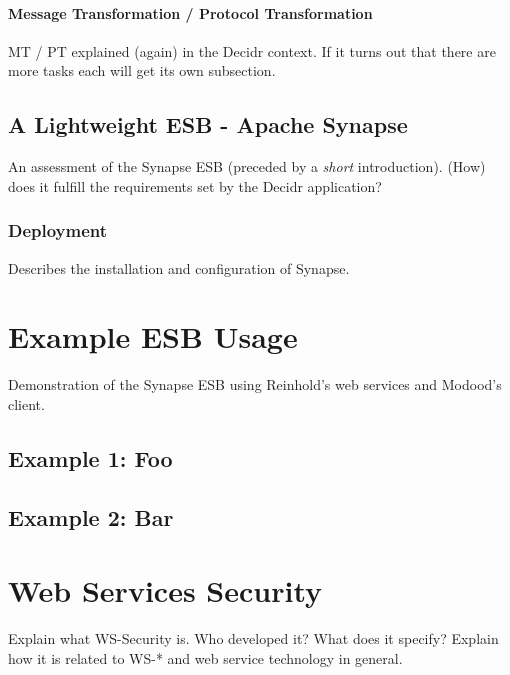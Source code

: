 \subsubsection{Message Transformation / Protocol Transformation}
\label{subsubsec:message-transformation-protocol-transformation}
MT / PT explained (again) in the Decidr context. If it turns out that there are
more tasks each will get its own subsection.

\section{A Lightweight ESB - Apache Synapse}
\label{sec:a-lightweight-esb-apache-synapse}

An assessment of the Synapse ESB (preceded by a \emph{short} introduction).
(How) does it fulfill the requirements set by the Decidr application? 

\subsection{Deployment}
\label{subsec:deployment}
Describes the installation and configuration of Synapse.

\chapter{Example ESB Usage}
\label{chap:example-esb-usage}

Demonstration of the Synapse ESB using Reinhold's web services and Modood's
client.

\section{Example 1: Foo}

\section{Example 2: Bar}

\chapter{Web Services Security}
\label{chap:web-services-security}
Explain what WS-Security is. Who developed it? What does it
specify? Explain how it is related to WS-* and web service
technology in general.

